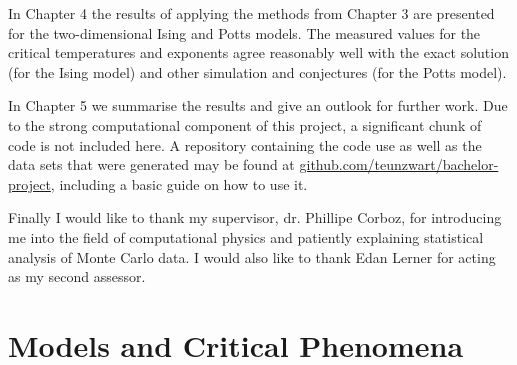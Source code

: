 \documentclass[11pt, a4paper]{report} %
\begin{document}
In Chapter 4 the results of applying the methods from Chapter 3 are presented for the two-dimensional Ising and Potts models.
The measured values for the critical temperatures and exponents agree reasonably well with the exact solution (for the Ising model) and other simulation and conjectures (for the Potts model).

In Chapter 5 we summarise the results and give an outlook for further work.
Due to the strong computational component of this project, a significant chunk of code is not included here.
A repository containing the code use as well as the data sets that were generated may be found at \url{github.com/teunzwart/bachelor-project}, including a basic guide on how to use it.

Finally I would like to thank my supervisor, dr. Phillipe Corboz, for introducing me into the field of computational physics and patiently explaining statistical analysis of Monte Carlo data.
I would also like to thank Edan Lerner for acting as my second assessor.

\chapter{Models and Critical Phenomena}
\end{document}
